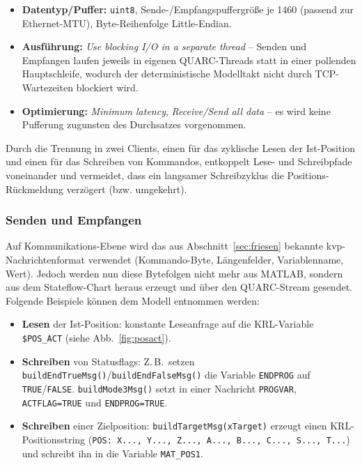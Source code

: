 \begin{itemize}
    \item \textbf{Datentyp/Puffer:} \texttt{uint8}, Sende-/Empfangs\-puffer\-größe
    je \SI{1460}{\byte} (passend zur Ethernet-MTU), Byte-Reihenfolge
    Little-Endian.
    \item \textbf{Ausführung:} \emph{Use blocking I/O in a separate thread}
    -- Senden und Empfangen laufen jeweils in eigenen QUARC-Threads statt in
    einer pollenden Hauptschleife, wodurch der deterministische Modelltakt
    nicht durch TCP-Wartezeiten blockiert wird.
    \item \textbf{Optimierung:} \emph{Minimum latency},
    \emph{Receive/Send all data} -- es wird keine Pufferung zugunsten des
    Durchsatzes vorgenommen.
\end{itemize}

Durch die Trennung in zwei Clients, einen für das zyklische Lesen der
Ist-Position und einen für das Schreiben von Kommandos, entkoppelt Lese-
und Schreibpfade voneinander und vermeidet, dass ein langsamer
Schreibzyklus die Positions-Rückmeldung verzögert (bzw. umgekehrt).

\subsubsection{Senden und Empfangen}
\label{sec:quarc-senden-empfangen}

Auf Kommunikations-Ebene wird das aus Abschnitt~\ref{sec:friesen} bekannte
\ac{kvp}-Nachrichtenformat verwendet (Kommando-Byte, Längenfelder,
Variablenname, Wert).
Jedoch werden nun diese Bytefolgen nicht mehr
aus MATLAB, sondern aus dem Stateflow-Chart heraus erzeugt und über den
QUARC-Stream gesendet. 
Folgende Beispiele können dem Modell entnommen werden:

\begin{itemize}
    \item \textbf{Lesen} der Ist-Position: konstante Leseanfrage auf die
    KRL-Variable \texttt{\$POS\_ACT} (siehe Abb.~\ref{fig:posact}).
    \item \textbf{Schreiben} von Statusflags: Z.\,B.\ setzen
    \texttt{buildEndTrueMsg()}/\texttt{buildEndFalseMsg()} die Variable
    \texttt{ENDPROG} auf \texttt{TRUE}/\texttt{FALSE}.  \texttt{buildMode3Msg()} setzt in einer Nachricht
    \texttt{PROGVAR}, \texttt{ACTFLAG=TRUE} und
    \texttt{ENDPROG=TRUE}.
    \item \textbf{Schreiben} einer Zielposition:
    \texttt{buildTargetMsg(xTarget)} erzeugt einen KRL-Positionsstring \newline
    (\verb|POS: X..., Y..., Z..., A..., B..., C..., S..., T...|) und schreibt ihn in die Variable
    \texttt{MAT\_POS1}.
\end{itemize}


